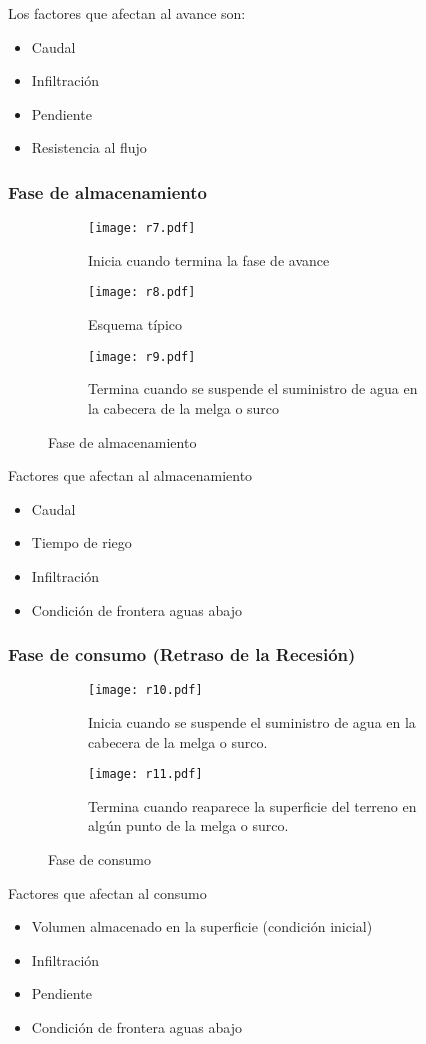 Los factores que afectan al avance son:
\begin{itemize}
    \item Caudal
    \item Infiltración
    \item Pendiente
    \item Resistencia al flujo
\end{itemize}
\subsubsection{Fase de almacenamiento}
\begin{figure}[h!]
	\centering
	\begin{subfigure}[b]{0.4\linewidth}
		\texttt{[image: r7.pdf]}
		\caption{Inicia cuando termina la fase de avance}
		\label{r7}
	\end{subfigure}
    \begin{subfigure}[b]{0.4\linewidth}
		\texttt{[image: r8.pdf]}
		\caption{Esquema típico}
		\label{rg8}
	\end{subfigure}
	\begin{subfigure}[b]{0.4\linewidth}
		\texttt{[image: r9.pdf]}
		\caption{Termina cuando se suspende el suministro de agua en la cabecera de la melga o surco}
		\label{rg9}
	\end{subfigure}
	\caption{Fase de almacenamiento}
	\label{rg7-9}
\end{figure}
Factores que afectan al almacenamiento
\begin{itemize}
    \item Caudal
    \item Tiempo de riego
    \item Infiltración
    \item Condición de frontera aguas abajo
\end{itemize}
\subsubsection{Fase de consumo (Retraso de la Recesión)}
\begin{figure}[h!]
	\centering
	\begin{subfigure}[b]{0.4\linewidth}
		\texttt{[image: r10.pdf]}
		\caption{Inicia cuando se suspende el suministro de agua en la cabecera de la melga o surco.}
		\label{r10}
	\end{subfigure}
    \begin{subfigure}[b]{0.4\linewidth}
		\texttt{[image: r11.pdf]}
		\caption{Termina cuando reaparece la superficie del terreno en algún punto de la melga o surco.}
		\label{rg11}
	\end{subfigure} 
	\caption{Fase de consumo}
	\label{rg10-11}
\end{figure}
Factores que afectan al consumo
\begin{itemize}
    \item Volumen almacenado en la superficie (condición inicial)
    \item Infiltración
    \item Pendiente
    \item Condición de frontera aguas abajo
\end{itemize}
